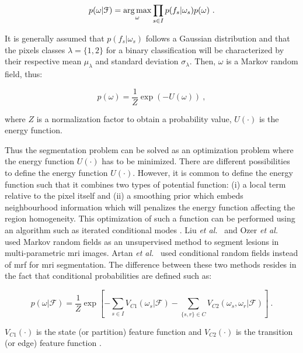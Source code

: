 \begin{equation}
	p(\omega|\mathcal{F}) = \operatorname*{arg\,max}_{\omega} \prod_{s \in I} p(f_s | \omega_s) p(\omega) \ .
	\label{eq:mrf1}
\end{equation}

It is generally assumed that $p(f_s | \omega_s)$ follows a Gaussian distribution and that the pixels classes $\lambda = \{1,2\}$ for a binary classification will be characterized by their respective mean $\mu_{\lambda}$ and standard deviation $\sigma_{\lambda}$.
Then, $\omega$ is a Markov random field, thus:

\begin{equation}
	p(\omega) =  \frac{1}{Z} \exp\left( -U(\omega) \right)  \ ,
	\label{eq:mrf2}
\end{equation}

\noindent where $Z$ is a normalization factor to obtain a probability value, $U(\cdot)$ is the energy function.

Thus the segmentation problem can be solved as an optimization problem where the energy function $U(\cdot)$ has to be minimized.
There are different possibilities to define the energy function $U(\cdot)$.
However, it is common to define the energy function such that it combines two types of potential function: (i) a local term relative to the pixel itself and (ii) a smoothing prior which embeds neighbourhood information which will penalizes the energy function affecting the region homogeneity.
This optimization of such a function can be performed using an algorithm such as iterated conditional modes \cite{Kato2001}.
Liu \textit{et al.}~\cite{Liu2009} and Ozer \textit{et al.}~\cite{Ozer2010} used Markov random fields as an unsupervised method to segment lesions in multi-parametric \ac{mri} images.
Artan \textit{et al.}~\cite{Artan2009,Artan2010} used conditional random fields instead of \ac{mrf} for \ac{mri} segmentation.
The difference between these two methods resides in the fact that conditional probabilities are defined such as:

\begin{equation}
	p(\omega|\mathcal{F}) =  \frac{1}{Z} \exp \left[ - \sum_{s \in I} V_{C1}(\omega_s|\mathcal{F}) - \sum_{\{s,r\} \in C } V_{C2} (\omega_s,\omega_r|\mathcal{F})  \right] \ .
\label{eq:crf}
\end{equation}

\noindent $V_{C1}(\cdot)$ is the state (or partition) feature function and $V_{C2}(\cdot)$ is the transition (or edge) feature function \cite{Kato2012}.


